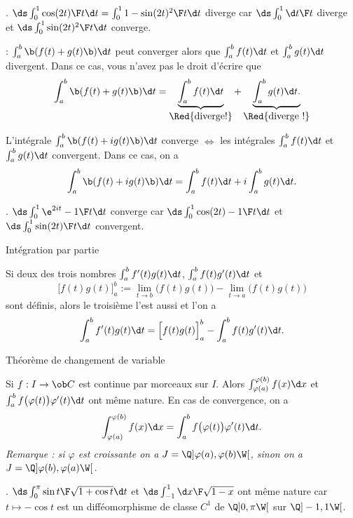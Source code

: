\Exemple. $\ds\int_0^1{\cos(2t)\F t}\d t=\int_0^1{1-\sin(2t)^2\F t}\d t$ diverge car $\ds\int_0^1{\d t\F t}$ diverge et $\ds\int_0^1{\sin(2t)^2\F t}\d t$ converge. 
\bigskip

\Remarque : $\int_a^b\b(f(t)+g(t)\b)\d t$ peut converger alors que $\int_a^bf(t)\d t$ et $\int_a^bg(t)\d t$ divergent. Dans ce cas, vous n'avez pas le droit d'\'ecrire que 
$$
\int_a^b\b(f(t)+g(t)\b)\d t=\underbrace{\int_a^bf(t)\d t}_{\mbox{\Red{diverge!}}}
+\underbrace{\int_a^bg(t)\d t. }_{\mbox{\Red{diverge !}}}
$$

%

L'int\'egrale $\int_a^b\b(f(t)+ig(t)\b)\d t$ converge $\Leftrightarrow$ les int\'egrales $\int_a^bf(t)\d t$ et $\int_a^bg(t)\d t$ convergent. 
Dans ce cas, on a 
$$
\int_a^b\b(f(t)+ig(t)\b)\d t=\int_a^bf(t)\d t+i\int_a^bg(t)\d t. 
$$

\Exemple. $\ds\int_0^1{\e^{2it}-1\F t}\d t$ converge car $\ds\int_0^1{\cos(2t)-1\F t}\d t$ et $\ds\int_0^1{\sin(2t)\F t}\d t$ convergent. 
\bigskip

\Concept Int\'egration par partie

Si deux des trois nombres $\int_a^bf'(t)g(t)\d t$, $\int_a^bf(t)g'(t)\d t$ et 
$$
\Big[f(t)g(t)\Big]_a^b:=\lim\limits_{t\to b}\Big(f(t)g(t)\Big)-\lim\limits_{t\to a}\Big(f(t)g(t)\Big)
$$
sont d\'efinis, alors le troisi\`eme l'est aussi et l'on a 
$$
\int_a^bf'(t)g(t)\d t=\Big[f(t)g(t)\Big]_a^b-\int_a^bf(t)g'(t)\d t. 
$$



\Concept Th\'eor\`eme de changement de variable


Si $f:I\to\ob C$ est continue par morceaux sur $I$. 
Alors $\int_{\varphi(a)}^{\varphi(b)}f(x)\d x$ et $\int_a^bf\big(\varphi(t)\big)\varphi'(t)\d t$ 
ont m\^eme nature. En cas de convergence, on a 
$$
\int_{\varphi(a)}^{\varphi(b)}f(x)\d x=\int_a^bf\big(\varphi(t)\big)\varphi'(t)\d t.
$$
{\it Remarque : si $\varphi$ est croissante on a $J=\Q]\varphi(a), \varphi(b)\W[$, sinon on a $J=\Q]\varphi(b),\varphi(a)\W[$. }

\Exemple. $\ds\int_0^\pi{\sin t\F\sqrt{1+\cos t}}\d t$ et $\ds\int_{-1}^1{\d x\F\sqrt{1-x}}$ ont m\^eme nature car $t\mapsto -\cos t$ 
est un diff\'eomorphisme de classe $C^1$ de $\Q]0,\pi\W[$ sur $\Q]-1,1\W[$. 
\bigskip


